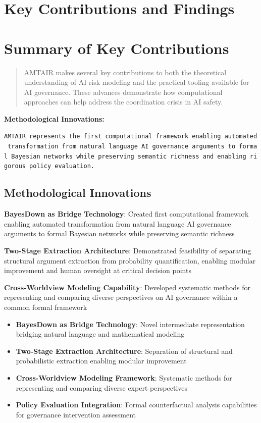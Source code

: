 \documentclass[
  11pt,
  letterpaper,
]{book}
\providecommand{\tightlist}{%
  \setlength{\itemsep}{0pt}\setlength{\parskip}{0pt}}
\begin{document}
\section{Key Contributions and Findings}\label{sec-key-contributions}

\section{Summary of Key Contributions}\label{sec-key-contributions2}

\begin{quote}
AMTAIR makes several key contributions to both the theoretical
understanding of AI risk modeling and the practical tooling available
for AI governance. These advances demonstrate how computational
approaches can help address the coordination crisis in AI safety.
\end{quote}

\textbf{Methodological Innovations:}

\texttt{AMTAIR\ represents\ the\ first\ computational\ framework\ enabling\ automated\ transformation\ from\ natural\ language\ AI\ governance\ arguments\ to\ formal\ Bayesian\ networks\ while\ preserving\ semantic\ richness\ and\ enabling\ rigorous\ policy\ evaluation.}

\subsection{Methodological
Innovations}\label{sec-methodological-innovations}

\textbf{BayesDown as Bridge Technology}: Created first computational
framework enabling automated transformation from natural language AI
governance arguments to formal Bayesian networks while preserving
semantic richness

\textbf{Two-Stage Extraction Architecture}: Demonstrated feasibility of
separating structural argument extraction from probability
quantification, enabling modular improvement and human oversight at
critical decision points

\textbf{Cross-Worldview Modeling Capability}: Developed systematic
methods for representing and comparing diverse perspectives on AI
governance within a common formal framework

\begin{itemize}
\tightlist
\item
  \textbf{BayesDown as Bridge Technology}: Novel intermediate
  representation bridging natural language and mathematical modeling
\item
  \textbf{Two-Stage Extraction Architecture}: Separation of structural
  and probabilistic extraction enabling modular improvement
\item
  \textbf{Cross-Worldview Modeling Framework}: Systematic methods for
  representing and comparing diverse expert perspectives
\item
  \textbf{Policy Evaluation Integration}: Formal counterfactual analysis
  capabilities for governance intervention assessment
\end{itemize}
\end{document}
